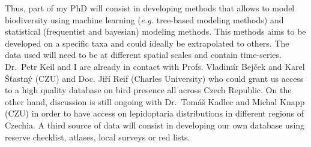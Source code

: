 \documentclass[
  12pt,
  oneside]{report}
\begin{document}
Thus, part of my PhD will consist in developing methods that allows to model biodiversity using machine learning (\emph{e.g.} tree-based modeling methods) and statistical (frequentist and bayesian) modeling methods. This methods aims to be developed on a specific taxa and could ideally be extrapolated to others. The data used will need to be at different spatial scales and contain time-series. Dr.~Petr Keil and I are already in contact with Profs. Vladimír Bejček and Karel Šťastný (CZU) and Doc. Jiří Reif (Charles University) who could grant us access to a high quality database on bird presence all across Czech Republic. On the other hand, discussion is still ongoing with Dr.~Tomáš Kadlec and Michal Knapp (CZU) in order to have access on lepidoptaria distributions in different regions of Czechia. A third source of data will consist in developing our own database using reserve checklist, atlases, local surveys or red lists.


\singlespacing %
\printbibliography
\end{document}
